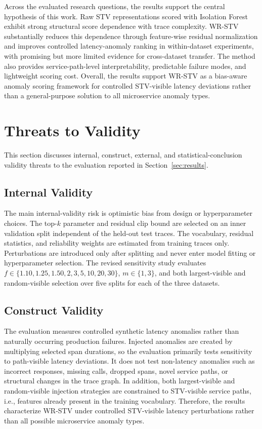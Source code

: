 \documentclass[informatics,article,submit,moreauthors]{Definitions/mdpi}
\newcommand{\rev}[1]{{\color{revisionblue}#1}}
\begin{document}
Across the evaluated research questions, the results support the central
hypothesis of this work. Raw STV representations scored with Isolation Forest exhibit strong structural score dependence with trace complexity.
WR-STV substantially reduces this dependence through feature-wise residual
normalization and improves controlled latency-anomaly ranking in
within-dataset experiments, with promising but more limited evidence for
cross-dataset transfer. The method also provides service-path-level
interpretability, predictable failure modes, and lightweight scoring
cost. Overall, the results support WR-STV as a bias-aware anomaly
scoring framework for controlled STV-visible latency deviations rather
than a general-purpose solution to all microservice anomaly types.


\section{Threats to Validity}
\label{sec:threats}

\rev{This section discusses internal, construct, external, and
statistical-conclusion validity threats to the evaluation reported in
Section~\ref{sec:results}.}

\subsection{Internal Validity}

\rev{The main internal-validity risk is optimistic bias from design or hyperparameter choices. The top-$k$ parameter and residual clip bound are selected on an inner validation split independent of the held-out test traces. The vocabulary, residual statistics, and reliability weights are estimated from training traces only. Perturbations are introduced only after splitting and never enter model fitting or hyperparameter selection. The revised sensitivity study evaluates $f\in\{1.10,1.25,1.50,2,3,5,10,20,30\}$, $m\in\{1,3\}$, and both largest-visible and random-visible selection over five splits for each of the three datasets.}

\subsection{Construct Validity}

The evaluation measures controlled synthetic latency anomalies rather
than naturally occurring production failures. Injected anomalies are
created by multiplying selected span durations, so the evaluation
primarily tests sensitivity to path-visible latency deviations. It does
not test non-latency anomalies such as incorrect responses, missing
calls, dropped spans, novel service paths, or structural changes in the
trace graph. In addition, both largest-visible and random-visible
injection strategies are constrained to STV-visible service paths, i.e.,
features already present in the training vocabulary. Therefore, the
results characterize WR-STV under controlled STV-visible latency
perturbations rather than all possible microservice anomaly types.
\end{document}
